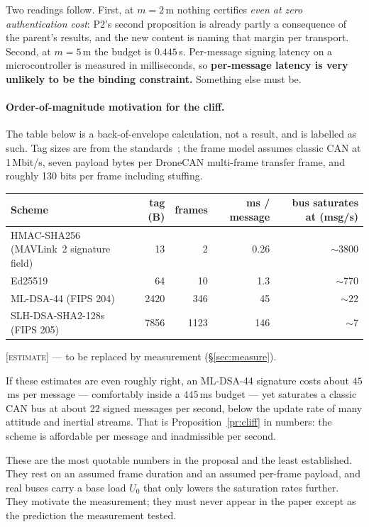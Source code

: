 \documentclass[11pt,a4paper]{article}
\newcommand{\prov}[1]{\textsc{\small[#1]}}
\begin{document}
\noindent
Two readings follow. First, at $m=2$\,m nothing certifies \emph{even at zero
authentication cost}: P2's second proposition is already partly a consequence
of the parent's results, and the new content is naming that margin per transport.
Second, at $m=5$\,m the budget is $0.445$\,s. Per-message signing latency on a
microcontroller is measured in milliseconds, so \textbf{per-message latency is
very unlikely to be the binding constraint.} Something else must be.

\paragraph{Order-of-magnitude motivation for the cliff.}
The table below is a back-of-envelope calculation, not a result, and is labelled
as such. Tag sizes are from the standards~\cite{nist_pqc}; the frame model
assumes classic CAN at 1\,Mbit/s, seven payload bytes per DroneCAN multi-frame
transfer frame, and roughly 130 bits per frame including stuffing.

\begin{center}\small
\begin{tabular}{@{}lrrrr@{}}
\toprule
Scheme & tag (B) & frames & ms / message & bus saturates at (msg/s) \\
\midrule
HMAC-SHA256 (MAVLink~2 signature field) & 13   & 2    & 0.26  & $\sim$3800 \\
Ed25519                                 & 64   & 10   & 1.3   & $\sim$770 \\
ML-DSA-44 (FIPS 204)                    & 2420 & 346  & 45    & $\sim$22 \\
SLH-DSA-SHA2-128s (FIPS 205)            & 7856 & 1123 & 146   & $\sim$7 \\
\bottomrule
\end{tabular}

\smallskip
\prov{estimate} --- to be replaced by measurement (\S\ref{sec:measure}).
\end{center}

\noindent
If these estimates are even roughly right, an ML-DSA-44 signature costs about
$45$\,ms per message --- comfortably inside a $445$\,ms budget --- yet saturates a
classic CAN bus at about 22 signed messages per second, below the update rate of
many attitude and inertial streams. That is Proposition~\ref{pr:cliff} in
numbers: the scheme is affordable per message and inadmissible per second.

\begin{honestly}
These are the most quotable numbers in the proposal and the least established.
They rest on an assumed frame duration and an assumed per-frame payload, and
real buses carry a base load $U_0$ that only lowers the saturation rates
further. They motivate the measurement; they must never appear in the paper
except as the prediction the measurement tested.
\end{honestly}
\end{document}
